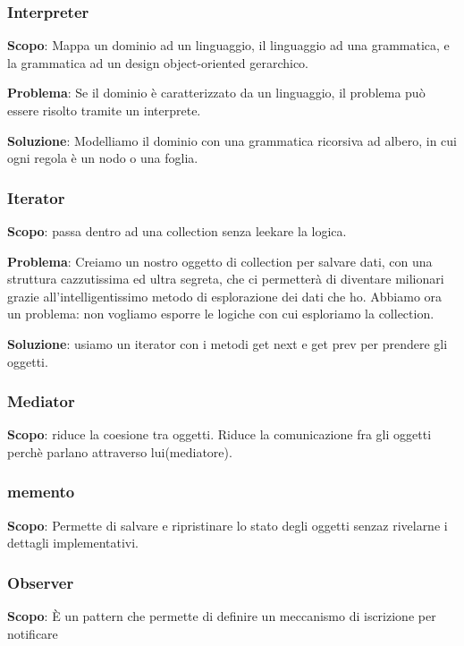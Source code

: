 \documentclass{article}
\begin{document}
\subsubsection{Interpreter}
\textbf{Scopo}: Mappa un dominio ad un linguaggio, il linguaggio ad una grammatica, e la
grammatica ad un design object-oriented gerarchico.

\textbf{Problema}: Se il dominio è
caratterizzato da un linguaggio, il problema può essere risolto tramite un interprete.

\textbf{Soluzione}: 
Modelliamo il dominio con una grammatica ricorsiva ad albero, in cui ogni regola è un nodo
o una foglia.




\subsubsection{Iterator}
\textbf{Scopo}: passa dentro ad una collection senza leekare la logica.

\textbf{Problema}: Creiamo un nostro oggetto di collection per salvare dati, con una struttura cazzutissima ed
ultra segreta, che ci permetterà di diventare milionari grazie all'intelligentissimo metodo di esplorazione dei
dati che ho. Abbiamo ora un problema: non vogliamo esporre le logiche con cui esploriamo la collection.

\textbf{Soluzione}: usiamo un iterator con i metodi get next e get prev per prendere gli oggetti.


\subsubsection{Mediator}
\textbf{Scopo}: riduce la coesione tra oggetti. 
Riduce la comunicazione 
fra gli oggetti perchè parlano attraverso lui(mediatore).



\subsubsection{memento}
\textbf{Scopo}: Permette di salvare e ripristinare lo stato degli oggetti 
senzaz rivelarne i dettagli implementativi.

\subsubsection{Observer}
\textbf{Scopo}: È un pattern che permette di definire un meccanismo di 
iscrizione per notificare 
\end{document}
